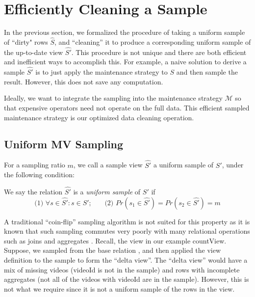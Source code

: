 \section{Efficiently Cleaning a Sample} \label{sampling}
In the previous section, we formalized the procedure of taking a uniform sample of ``dirty" rows $\hat{S}$, and ``cleaning'' it to produce a corresponding uniform sample of the up-to-date view $\hat{S'}$.
This procedure is not unique and there are both efficient and inefficient ways to accomplish this. 
For example, a naive solution to derive a sample $\hat{S'}$ is to just apply the maintenance strategy to $S$ and then sample the result.
However, this does not save any computation.

Ideally, we want to integrate the sampling into the maintenance strategy $\mathcal{M}$ so that expensive operators
need not operate on the full data.
This efficient sampled maintenance strategy is our optimized data cleaning operation.

\subsection{Uniform MV Sampling}
For a sampling ratio $m$, we call a sample view $\hat{S'}$ a uniform sample of $S'$, under the following condition:
\begin{definition} We say the relation $\hat{S'}$ is a \emph{uniform sample} of $S'$ if
\[\text{(1) } \forall s \in \hat{S'} : s \in S'\text{;~~~~~ (2) }Pr(s_1 \in \hat{S'}) =  Pr(s_2 \in \hat{S'}) = m\]
\end{definition}
A traditional ``coin-flip'' sampling algorithm is not suited for this property as it is known that such sampling commutes very poorly with many relational operations such as joins and aggregates \cite{chaudhuri1999random}.
Recall, the view in our example \textsf{countView}. 
Suppose, we sampled from the base relation , and then applied the view definition to the sample to form the ``delta view''.
The ``delta view'' would have a mix of missing videos (\textsf{videoId} is not in the sample) and rows with incomplete aggregates (not all of the videos with \textsf{videoId} are in the sample).
However, this is not what we require since it is not a uniform sample of the rows in the view. 

